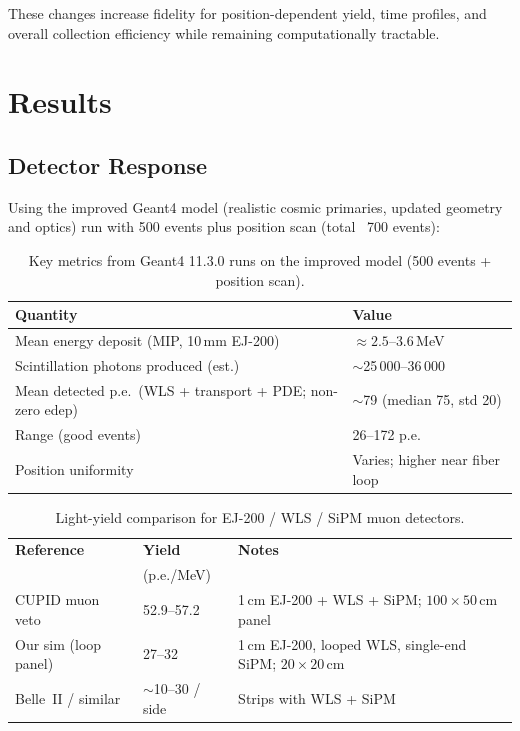 \documentclass[11pt,a4paper]{article}
\begin{document}
These changes increase fidelity for position-dependent yield, time profiles, and overall collection efficiency while remaining computationally tractable.

\section{Results}

\subsection{Detector Response}
Using the improved Geant4 model (realistic cosmic primaries, updated geometry and optics) run with 500 events plus position scan (total ~700 events):

\begin{table}[H]
\centering
\small
\begin{tabular}{@{}p{}p{}@{}}
\toprule
\textbf{Quantity} & \textbf{Value} \\
\midrule
Mean energy deposit (MIP, 10\,mm EJ-200) &
  $\approx 2.5$--$3.6$\,MeV \\[0.35em]
Scintillation photons produced (est.) &
  $\sim$25\,000--36\,000 \\[0.35em]
Mean detected p.e.\ (WLS + transport + PDE; non-zero edep) &
  $\sim$79 (median 75, std 20) \\[0.35em]
Range (good events) &
  26--172 p.e. \\[0.35em]
Position uniformity &
  Varies; higher near fiber loop \\
\bottomrule
\end{tabular}
\caption{Key metrics from Geant4 11.3.0 runs on the improved model (500 events + position scan).}
\end{table}

\begin{table}[H]
\centering
\small
\begin{tabular}{@{}p{}p{}p{}@{}}
\toprule
\textbf{Reference} & \textbf{Yield} & \textbf{Notes} \\
 & (p.e./MeV) & \\
\midrule
CUPID muon veto \cite{cupid-muon} &
  52.9--57.2 &
  1\,cm EJ-200 + WLS + SiPM; $100\times50$\,cm panel \\[0.45em]
Our sim (loop panel) &
  27--32 &
  1\,cm EJ-200, looped WLS, single-end SiPM; $20\times20$\,cm \\[0.45em]
Belle~II / similar &
  $\sim$10--30 / side &
  Strips with WLS + SiPM \\
\bottomrule
\end{tabular}
\caption{Light-yield comparison for EJ-200 / WLS / SiPM muon detectors.}
\end{table}
\end{document}

